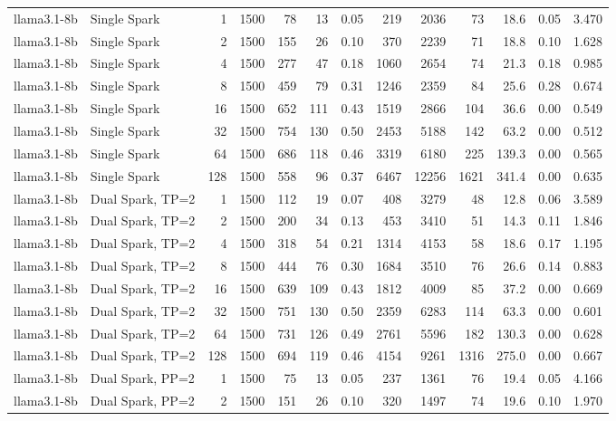 \begin{tabular}{l l r r r r r r r r r r r}
\addlinespace
llama3.1-8b & Single Spark & 1 & 1500 & 78\rlap{$^\dagger$} & 13 & 0.05 & 219 & 2036 & 73 & 18.6 & 0.05 & 3.470 \\
llama3.1-8b & Single Spark & 2 & 1500 & 155 & 26 & 0.10 & 370 & 2239 & 71 & 18.8 & 0.10 & 1.628 \\
llama3.1-8b & Single Spark & 4 & 1500 & 277 & 47 & 0.18 & 1060 & 2654 & 74 & 21.3 & 0.18 & 0.985 \\
llama3.1-8b & Single Spark & 8 & 1500 & 459 & 79 & 0.31 & 1246 & 2359 & 84 & 25.6 & 0.28 & 0.674 \\
llama3.1-8b & Single Spark & 16 & 1500 & 652 & 111 & 0.43 & 1519 & 2866 & 104 & 36.6 & 0.00 & 0.549 \\
llama3.1-8b & Single Spark & 32 & 1500 & 754 & 130 & 0.50 & 2453 & 5188 & 142 & 63.2 & 0.00 & 0.512 \\
llama3.1-8b & Single Spark & 64 & 1500 & 686 & 118 & 0.46 & 3319 & 6180 & 225 & 139.3 & 0.00 & 0.565 \\
llama3.1-8b & Single Spark & 128 & 1500 & 558 & 96 & 0.37 & 6467 & 12256 & 1621 & 341.4 & 0.00 & 0.635 \\
\addlinespace
llama3.1-8b & Dual Spark, TP=2 & 1 & 1500 & 112 & 19 & 0.07 & 408 & 3279 & 48 & 12.8 & 0.06 & 3.589 \\
llama3.1-8b & Dual Spark, TP=2 & 2 & 1500 & 200 & 34 & 0.13 & 453 & 3410 & 51 & 14.3 & 0.11 & 1.846 \\
llama3.1-8b & Dual Spark, TP=2 & 4 & 1500 & 318 & 54 & 0.21 & 1314 & 4153 & 58 & 18.6 & 0.17 & 1.195 \\
llama3.1-8b & Dual Spark, TP=2 & 8 & 1500 & 444 & 76 & 0.30 & 1684 & 3510 & 76 & 26.6 & 0.14 & 0.883 \\
llama3.1-8b & Dual Spark, TP=2 & 16 & 1500 & 639 & 109 & 0.43 & 1812 & 4009 & 85 & 37.2 & 0.00 & 0.669 \\
llama3.1-8b & Dual Spark, TP=2 & 32 & 1500 & 751 & 130 & 0.50 & 2359 & 6283 & 114 & 63.3 & 0.00 & 0.601 \\
llama3.1-8b & Dual Spark, TP=2 & 64 & 1500 & 731 & 126 & 0.49 & 2761 & 5596 & 182 & 130.3 & 0.00 & 0.628 \\
llama3.1-8b & Dual Spark, TP=2 & 128 & 1500 & 694 & 119 & 0.46 & 4154 & 9261 & 1316 & 275.0 & 0.00 & 0.667 \\
\addlinespace
llama3.1-8b & Dual Spark, PP=2 & 1 & 1500 & 75\rlap{$^\dagger$} & 13 & 0.05 & 237 & 1361 & 76 & 19.4 & 0.05 & 4.166 \\
llama3.1-8b & Dual Spark, PP=2 & 2 & 1500 & 151 & 26 & 0.10 & 320 & 1497 & 74 & 19.6 & 0.10 & 1.970 \\

\end{tabular}
